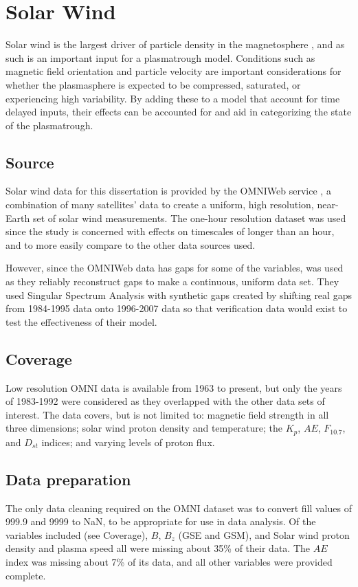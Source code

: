 \section{Solar Wind}
Solar wind is the largest driver of particle density in the magnetosphere , and as such is an important input for a plasmatrough model. Conditions such as magnetic field orientation and particle velocity are important considerations for whether the plasmasphere is expected to be compressed, saturated, or experiencing high variability. By adding these to a model that account for time delayed inputs, their effects can be accounted for and aid in categorizing the state of the plasmatrough.

\subsection{Source}
Solar wind data for this dissertation is provided by the OMNIWeb service , a combination of many satellites' data to create a uniform, high resolution, near-Earth set of solar wind measurements. The one-hour resolution dataset was used since the study is concerned with effects on timescales of longer than an hour, and to more easily compare to the other data sources used. 

However, since the OMNIWeb data has gaps for some of the variables, \cite{Kondrashov2014ReconstructionOfGaps} was used as they reliably reconstruct gaps to make a continuous, uniform data set. They used Singular Spectrum Analysis with synthetic gaps created by shifting real gaps from 1984-1995 data onto 1996-2007 data so that verification data would exist to test the effectiveness of their model. 

\subsection{Coverage}
Low resolution OMNI data is available from 1963 to present, but only the years of 1983-1992 were considered as they overlapped with the other data sets of interest. The data covers, but is not limited to: magnetic field strength in all three dimensions; solar wind proton density and temperature; the $K_p$, $AE$, $F_{10.7}$, and $D_{st}$ indices; and varying levels of proton flux.

\subsection{Data preparation}
The only data cleaning required on the OMNI dataset was to convert fill values of 999.9 and 9999 to NaN, to be appropriate for use in data analysis. Of the variables included (see Coverage), $B$, $B_z$ (GSE and GSM), and Solar wind proton density and plasma speed all were missing about 35\% of their data. The $AE$ index was missing about 7\% of its data, and all other variables were provided complete.

